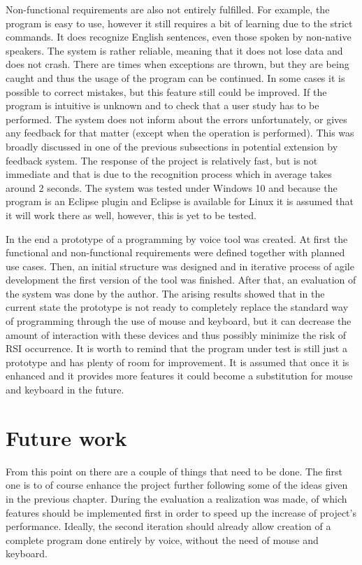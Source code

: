 Non-functional requirements are also not entirely fulfilled. For example, the program is easy to use, however it still requires a bit of learning due to the strict commands. It does recognize English sentences, even those spoken by non-native speakers. The system is rather reliable, meaning that it does not lose data and does not crash. There are times when exceptions are thrown, but they are being caught and thus the usage of the program can be continued. In some cases it is possible to correct mistakes, but this feature still could be improved. If the program is intuitive is unknown and to check that a user study has to be performed. The system does not inform about the errors unfortunately, or gives any feedback for that matter (except when the operation is performed). This was broadly discussed in one of the previous subsections in potential extension by feedback system. The response of the project is relatively fast, but is not immediate and that is due to the recognition process which in average takes around 2 seconds. The system was tested under Windows 10 and because the program is an Eclipse plugin and Eclipse is available for Linux it is assumed that it will work there as well, however, this is yet to be tested.

In the end a prototype of a programming by voice tool was created. At first the functional and non-functional requirements were defined together with planned use cases. Then, an initial structure was designed and in iterative process of agile development the first version of the tool was finished. After that, an evaluation of the system was done by the author. The arising results showed that in the current state the prototype is not ready to completely replace the standard way of programming through the use of mouse and keyboard, but it can decrease the amount of interaction with these devices and thus possibly minimize the risk of RSI occurrence. It is worth to remind that the program under test is still just a prototype and has plenty of room for improvement. It is assumed that once it is enhanced and it provides more features it could become a substitution for mouse and keyboard in the future.


\section{Future work}

From this point on there are a couple of things that need to be done. The first one is to of course enhance the project further following some of the ideas given in the previous chapter. During the evaluation a realization was made, of which features should be implemented first in order to speed up the increase of project's performance. Ideally, the second iteration should already allow creation of a complete program done entirely by voice, without the need of mouse and keyboard.


